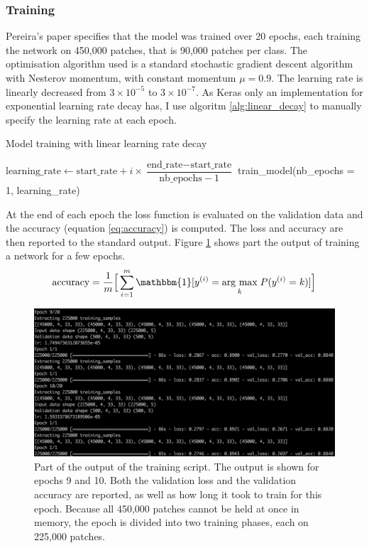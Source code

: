\documentclass[12pt,a4paper,twoside,openright]{report}
\newcommand{\argmax}[1]{\underset{#1}{\operatorname{arg}\,\operatorname{max}}\;} %
\begin{document}
\subsubsection{Training}
Pereira's paper specifies that the model was trained over 20 epochs, each training the network on 450,000 patches, that is 90,000 patches per class. The optimisation algorithm used is a standard stochastic gradient descent algorithm with Nesterov momentum, with constant momentum $\mu = 0.9$. The learning rate is linearly decreased from $3 \times 10^{-5}$ to $3 \times 10^{-7}$. As Keras only an implementation for exponential learning rate decay has, I use algoritm \ref{alg:linear_decay} to manually specify the learning rate at each epoch.

\begin{algorithm}
\caption{Model training with linear learning rate decay}
\label{alg:linear_decay}
\begin{algorithmic}[1]
	\State $\text{learning\_rate} \gets \text{start\_rate} + i \times \dfrac{\text{end\_rate} - \text{start\_rate} }{ \text{nb\_epochs} - 1 }$
	\State train\_model(nb\_epochs = 1, learning\_rate)
\EndFor
\end{algorithmic}
\end{algorithm}

At the end of each epoch the loss function is evaluated on the validation data and the accuracy (equation \ref{eq:accuracy}) is computed. The loss and accuracy are then reported to the standard output. Figure \ref{fig:training_output} shows part the output of training a network for a few epochs.
\begin{equation}
	\label{eq:accuracy}
		\text{accuracy} = 
	\frac{1}{m}\Big[\sum_{i=1}^m\mathbbm{1}[y^{(i)} = \argmax{k}P(y^{(i)}=k)]\Big]
\end{equation}
\begin{figure}
	\centering
	\includegraphics[width=\textwidth]{training_output}
	\caption[Part of the output of the training script.]{Part of the output of the training script. The output is shown for epochs 9 and 10. Both the validation loss and the validation accuracy are reported, as well as how long it took to train for this epoch. Because all 450,000 patches cannot be held at once in memory, the epoch is divided into two training phases, each on 225,000 patches.}
	\label{fig:training_output}
\end{figure}
\end{document}
